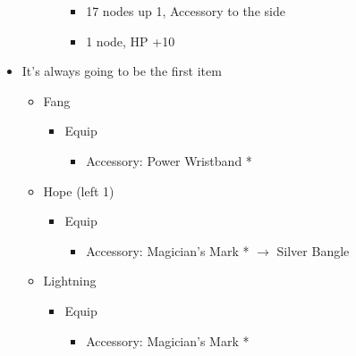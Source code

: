 \begin{menu}
\begin{itemize}
\begin{itemize}
\begin{itemize}
\begin{itemize}
                \item 17 nodes up 1, Accessory to the side
                \item 1 node, HP +10
            \end{itemize}
        \end{itemize}
    \end{itemize}
    \equip
    \item It's always going to be the first item
    \begin{itemize}
        \item Fang
        \begin{itemize}
            \item Equip
            \begin{itemize}
                \item Accessory: Power Wristband *
            \end{itemize}
        \end{itemize}
        \item Hope (left 1)
        \begin{itemize}
            \item Equip
            \begin{itemize}
                \item Accessory:  Magician's Mark * $\rightarrow$ Silver Bangle
            \end{itemize}
        \end{itemize}
        \item Lightning
        \begin{itemize}
            \item Equip
            \begin{itemize}
                \item Accessory: Magician's Mark *
            \end{itemize}
        \end{itemize}
    \end{itemize}
\end{itemize}
\end{menu}

\renewcommand{\first}{[1] Aggression (\com/\com/\rav)}
\renewcommand{\second}{[2] Relentless Assault (\com/\rav/\rav)}
\renewcommand{\third}{[3] Smart Bomb (\sab/\rav/\rav)}
\renewcommand{\fourth}{[4] Mystic Tower (\sen/\rav/\rav)}
\renewcommand{\fifth}{[5] Guerilla (\sab/\rav/\syn)}
\renewcommand{\sixth}{[6] Relentless Assault (\com/\rav/\rav)}

